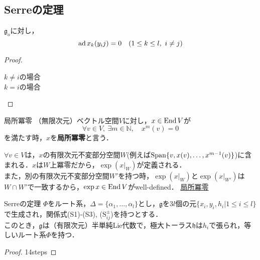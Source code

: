 \documentclass[rep_main]{subfiles}
\begin{document}
\subsection{Serreの定理}

\begin{mylem}[label=lem:Serre]{}
	$\mathfrak{g}_o$に対し，
	\begin{equation}
		\ad x_k(y_ij) = 0\quad  (1 \leq k \leq l,\ i \neq j)
	\end{equation}
\end{mylem}
\begin{proof}
	\begin{description}
	\item[$k \neq i$の場合]
	\item[$k = i$の場合]
	\end{description}
\end{proof}

\begin{mydef}[label=def:locally-nilpotent]{局所冪零}
	（無限次元）ベクトル空間$V$に対し，$x \in \operatorname{End} V$が
	\begin{equation}
		\forall v \in V,\ \exists m \in \mathbb{N},\quad  x^m(v) = 0
	\end{equation}
	を満たす時，$x$を\textbf{局所冪零}と言う．
\end{mydef}
$\forall v \in V$は，$x$の有限次元不変部分空間$W$(例えば$\operatorname{Span}\{v, x(v),\ldots , x^{m-1}(v)\}$)に含まれる．$x$は$W$上冪零だから，$\exp(x|_W)$が定義される．\\
また，別の有限次元不変部分空間$W'$を持つ時，$\exp(x|_W)$と$\exp(x|_{W'})$は$W \cap W'$で一致するから，$\exp x \in \operatorname{End} V$がwell-defined．
\hyperref[locally-nilpotent]{局所冪零}
\begin{mytheo}[label=thm:Serre]{Serreの定理}
	$\Phi$をルート系，$\Delta = \{\alpha_1, \ldots, \alpha_l\}$とし，$\mathfrak{g}$を$3l$個の元$\{x_i, y_i, h_i | 1 \leq i \leq l\}$で生成され，関係式(S1)-(S3), ($\text{S}_{ij}^\pm$)を持つとする．\\
	このとき，$\mathfrak{g}$は（有限次元）半単純Lie代数で，極大トーラス$\mathfrak{h}$は$h_i$で張られ，等しいルート系$\Phi$を持つ．
\end{mytheo}
\begin{proof}
	14steps
\end{proof}
\end{document}
